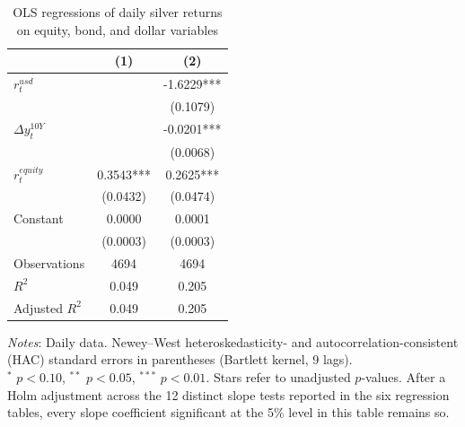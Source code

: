\begin{table}[H]
\centering
\caption{OLS regressions of daily silver returns on equity, bond, and dollar variables}
\label{tab:ols_silver_equity}
\begin{tabular}{lcc}
\toprule
 & (1) & (2) \\
\midrule
$r^{usd}_t$ &  & -1.6229*** \\
 &  & (0.1079) \\
$\Delta y^{10Y}_t$ &  & -0.0201*** \\
 &  & (0.0068) \\
$r^{equity}_t$ & 0.3543*** & 0.2625*** \\
 & (0.0432) & (0.0474) \\
Constant & 0.0000 & 0.0001 \\
 & (0.0003) & (0.0003) \\
Observations & 4694 & 4694 \\
$R^2$ & 0.049 & 0.205 \\
Adjusted $R^2$ & 0.049 & 0.205 \\
\bottomrule
\end{tabular}

\vspace{0.2cm}
\begin{minipage}{0.9\textwidth}
\footnotesize
\textit{Notes}: Daily data. Newey--West heteroskedasticity- and autocorrelation-consistent (HAC) standard errors in parentheses (Bartlett kernel, 9 lags).\\
$^*$ $p<0.10$, $^{**}$ $p<0.05$, $^{***}$ $p<0.01$. Stars refer to unadjusted $p$-values. After a Holm adjustment across the 12 distinct slope tests reported in the six regression tables, every slope coefficient significant at the 5\% level in this table remains so.
\end{minipage}
\end{table}
